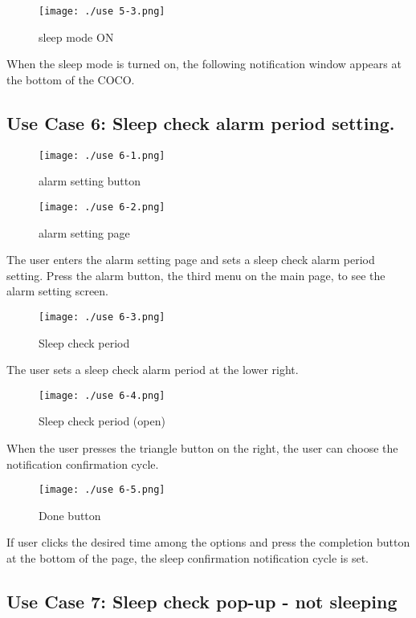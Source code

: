 \documentclass[conference]{IEEEtran}
\begin{document}
\begin{figure}[H]
\texttt{[image: ./use 5-3.png]}
\centering
\caption{sleep mode ON}
\end{figure}

When the sleep mode is turned on, the following notification window appears at the bottom of the COCO.

\subsection{Use Case 6: Sleep check alarm period setting.}

\begin{figure}[H]
\texttt{[image: ./use 6-1.png]}
\centering
\caption{alarm setting button}
\end{figure}

\begin{figure}[H]
\texttt{[image: ./use 6-2.png]}
\centering
\caption{alarm setting page}
\end{figure}

The user enters the alarm setting page and sets a sleep check alarm period setting. Press the alarm button, the third menu on the main page, to see the alarm setting screen.

\begin{figure}[H]
\texttt{[image: ./use 6-3.png]}
\centering
\caption{Sleep check period}
\end{figure}

The user sets a sleep check alarm period at the lower right.

\begin{figure}[H]
\texttt{[image: ./use 6-4.png]}
\centering
\caption{Sleep check period (open)}
\end{figure}

When the user presses the triangle button on the right, the user can choose the notification confirmation cycle.

\begin{figure}[H]
\texttt{[image: ./use 6-5.png]}
\centering
\caption{Done button}
\end{figure}

If user clicks the desired time among the options and press the completion button at the bottom of the page, the sleep confirmation notification cycle is set.

\subsection{Use Case 7: Sleep check pop-up - not sleeping}
\end{document}

